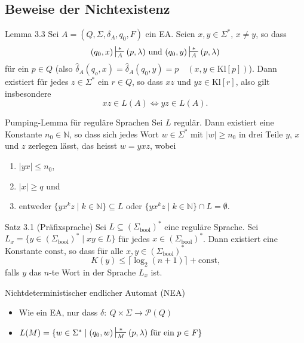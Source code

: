 \documentclass[a4paper,10pt]{article}
\begin{document}
\subsection{Beweise der Nichtexistenz}
\begin{mainbox}{Lemma 3.3}
    Sei $A = (Q, \Sigma, \delta_A, q_0, F)$ ein EA. Seien $x, y \in \Sigma^*,\, x \neq y$, so dass
    \[(q_0, x) \sststile{A}{*} (p, \lambda)\ \text{und}\ (q_0, y) \sststile{A}{*} (p, \lambda)\]
    für ein $p \in Q$ (also $\hat{\delta}_A(q_o, x) = \hat{\delta}_A(q_0, y) = p\quad (x, y \in \textrm{Kl}[p])$). Dann existiert für jedes $z \in \Sigma^*$ ein $r \in Q$, so dass $xz$ und $yz \in \textrm{Kl}[r]$, also gilt insbesondere
    \[xz \in L(A) \iff yz \in L(A) \text{.}\]
\end{mainbox}
\begin{mainbox}{Pumping-Lemma für reguläre Sprachen}
    Sei $L$ regulär. Dann existiert eine Konstante $n_0 \in \mathbb{N}$, so dass sich jedes Wort $w \in \Sigma^*$ mit $|w| \geq n_0$ in drei Teile $y$, $x$ und $z$ zerlegen lässt, das heisst $w = yxz$, wobei
    \begin{enumerate}
        \item $|yx| \leq n_0$,
        \item $|x| \geq q$ und
        \item entweder $\{yx^kz \;|\; k \in \mathbb{N}\} \subseteq L$ oder $\{yx^kz \;|\; k \in \mathbb{N}\} \cap L = \emptyset$.
    \end{enumerate}
\end{mainbox}
\begin{mainbox}{Satz 3.1 (Präfixsprache)}
    Sei $L \subseteq (\Sigma_\textrm{bool})^*$ eine reguläre Sprache. Sei $L_x = \{y \in (\Sigma_\textrm{bool})^* \;|\; xy \in L\}$ für jedes $x \in (\Sigma_\textrm{bool})^*$. Dann existiert eine Konstante $\textrm{const}$, so dass für alle $x, y \in (\Sigma_\textrm{bool})^*$
    \[K(y) \leq \lceil \log_2 (n + 1) \rceil + \textrm{const} \text{,}\]
    falls $y$ das $n$-te Wort in der Sprache $L_x$ ist.
\end{mainbox}
\begin{mainbox}{Nichtdeterministischer endlicher Automat (NEA)}
    \begin{itemize}
        \item Wie ein EA, nur dass $\delta:\: Q \times \Sigma \to \mathcal{P}(Q)$
        \item $L(M) = \{w \in \Sigma^* \;|\; (q_0, w) \sststile{M}{*} (p, \lambda)\ \text{für ein}\ p \in F\}$
    \end{itemize}
\end{mainbox}
\end{document}
